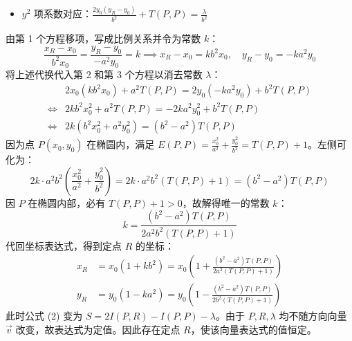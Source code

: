 \begin{solution}
\begin{itemize}
\item $y^2$ 项系数对应：$\frac{2y_0(y_R - y_0)}{b^2} + T(P,P) = \frac{\lambda}{b^2}$
\end{itemize}
由第 1 个方程移项，写成比例关系并令为常数 $k$：
$$\frac{x_R - x_0}{b^2 x_0} = \frac{y_R - y_0}{-a^2 y_0} = k \implies x_R - x_0 = k b^2 x_0, \quad y_R - y_0 = -k a^2 y_0$$
将上述代换代入第 2 和第 3 个方程以消去常数 $\lambda$：
\begin{align*}
&2x_0(k b^2 x_0) + a^2 T(P,P) = 2y_0(-k a^2 y_0) + b^2 T(P,P)\\
\Leftrightarrow &2k b^2 x_0^2 + a^2 T(P,P) = -2k a^2 y_0^2 + b^2 T(P,P)\\
\Leftrightarrow &2k (b^2 x_0^2 + a^2 y_0^2) = (b^2 - a^2) T(P,P)
\end{align*}
因为点 $P(x_0,y_0)$ 在椭圆内，满足 $E(P,P) = \frac{x_0^2}{a^2} + \frac{y_0^2}{b^2} = T(P,P) + 1$。左侧可化为：
$$2k \cdot a^2 b^2 \left(\frac{x_0^2}{a^2} + \frac{y_0^2}{b^2}\right) = 2k \cdot a^2 b^2 (T(P,P) + 1) = (b^2 - a^2) T(P,P)$$
因 $P$ 在椭圆内部，必有 $T(P,P)+1 > 0$，故解得唯一的常数 $k$：
$$k = \frac{(b^2 - a^2) T(P,P)}{2 a^2 b^2 (T(P,P) + 1)}$$
代回坐标表达式，得到定点 $R$ 的坐标：
\begin{align*}
x_R &= x_0 \left( 1 + k b^2 \right) = x_0 \left( 1 + \frac{(b^2 - a^2) T(P,P)}{2 a^2 (T(P,P) + 1)} \right)\\
y_R &= y_0 \left( 1 - k a^2 \right) = y_0 \left( 1 - \frac{(b^2 - a^2) T(P,P)}{2 b^2 (T(P,P) + 1)} \right)
\end{align*}
此时公式 (2) 变为 $S = 2I(P, R) - I(P,P) - \lambda$。由于 $P, R, \lambda$ 均不随方向向量 $\vec{v}$ 改变，故表达式为定值。因此存在定点 $R$，使该向量表达式的值恒定。
\end{solution}


